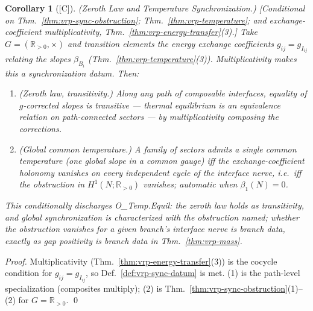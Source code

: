 \documentclass[12pt,oneside]{amsbook}
\theoremstyle{plain}
\newtheorem{corollary}[theorem]{Corollary}
\theoremstyle{definition}
\theoremstyle{remark}
\newcommand{\status}[1]{\textup{[#1]}}
\begin{document}
\begin{corollary}[\status{C}]\label{cor:vrp-temp-equil-discharge}
\textup{(Zeroth Law and Temperature Synchronization.)}
\textup{[Conditional on Thm.~\ref{thm:vrp-sync-obstruction};
Thm.~\ref{thm:vrp-temperature}; and exchange-coefficient
multiplicativity, Thm.~\ref{thm:vrp-energy-transfer}(3).]}
Take $G = (\mathbb{R}_{>0}, \times)$ and transition elements the
energy exchange coefficients $g_{ij} = g_{I_{ij}}$ relating the
slopes $\beta_{B_i}$ (Thm.~\ref{thm:vrp-temperature}(3)).
Multiplicativity makes this a synchronization datum.  Then:
\begin{enumerate}[label=\textup{(\arabic*)}]
  \item \emph{(Zeroth law, transitivity.)}  Along any path of
    composable interfaces, equality of $g$-corrected slopes is
    transitive --- thermal equilibrium is an equivalence relation
    on path-connected sectors --- by multiplicativity composing
    the corrections.
  \item \emph{(Global common temperature.)}  A family of sectors
    admits a single common temperature (one global slope in a
    common gauge) iff the exchange-coefficient holonomy vanishes
    on every independent cycle of the interface nerve, i.e.\ iff
    the obstruction in $H^1(N; \mathbb{R}_{>0})$ vanishes;
    automatic when $\beta_1(N) = 0$.
\end{enumerate}
This conditionally discharges O\_Temp.Equil: the zeroth law holds
as transitivity, and global synchronization is characterized with
the obstruction named; whether the obstruction vanishes for a
given branch's interface nerve is branch data, exactly as gap
positivity is branch data in Thm.~\ref{thm:vrp-mass}.
\end{corollary}

\begin{proof}
Multiplicativity (Thm.~\ref{thm:vrp-energy-transfer}(3)) is the
cocycle condition for $g_{ij} = g_{I_{ij}}$, so
Def.~\ref{def:vrp-sync-datum} is met.  (1) is the path-level
specialization (composites multiply); (2) is
Thm.~\ref{thm:vrp-sync-obstruction}(1)--(2) for
$G = \mathbb{R}_{>0}$. \qed
\end{proof}
\end{document}
